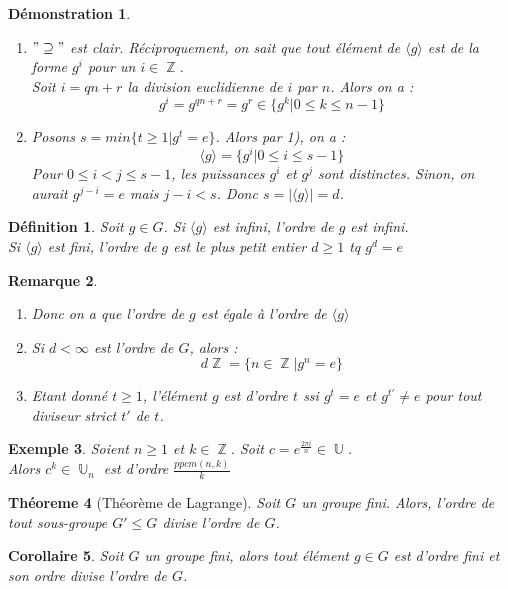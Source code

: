\documentclass[a4paper, oneside]{report}
\theoremstyle{break}
\newtheorem{thm}{Théoreme}[section] %
\newtheorem{defi}[thm]{Définition}
\newtheorem{cor}[thm]{Corollaire}
\newtheorem{exem}[thm]{Exemple}
\newtheorem{remar}[thm]{Remarque}
\newtheorem*{demo}{Démonstration}
\DeclareMathOperator{\Z}{\mathbb{Z}}
\DeclareMathOperator{\U}{\mathbb{U}}
\begin{document}
\begin{demo}
	\begin{enumerate}
		\item $"\supseteq"$ est clair. Réciproquement, on sait que tout élément de $\langle g\rangle$ est de la forme $g^i$ pour un $i \in \Z$.\\
		Soit $i=qn+r$ la division euclidienne de $i$ par $n$. Alors on a :
		$$g^i=g^{qn+r}=g^r \in \{g^k | 0\leq k \leq n-1 \}$$
		
		\item Posons $s=min\{t \geq 1 | g^t=e \}$. Alors par 1), on a :
		$$\langle g\rangle = \{g^i | 0\leq i \leq s-1 \}$$
		Pour $0\leq i < j \leq s-1$, les puissances $g^i$ et $g^j$ sont distinctes. Sinon, on aurait $g^{j-i}=e$ mais $j-i<s$. Donc $s=|\langle g\rangle| = d$.
	\end{enumerate}	
\end{demo}

\begin{defi}
	Soit $g\in G$. Si $\langle g\rangle$ est infini, l'ordre de $g$ est infini.\\
	Si $\langle g\rangle$ est fini, l'ordre de $g$ est le plus petit entier $d\geq 1$ tq $g^d=e$	
\end{defi}

\begin{remar}
	\begin{enumerate}
		\item Donc on a que l'ordre de $g$ est égale à l'ordre de $\langle g\rangle$
		\item Si $d<\infty$ est l'ordre de $G$, alors :
		$$d\Z=\{n\in \Z | g^n =e \}$$
		\item Etant donné $t\geq 1$, l'élément $g$ est d'ordre $t$ ssi $g^t=e$ et $g^{t'}\neq e$ pour tout diviseur strict $t'$ de $t$.
	\end{enumerate}	
\end{remar}

\begin{exem}
	Soient $n\geq 1$ et $k\in \Z$. Soit $c=e^{\frac{2\pi i}{n}}\in \U$.\\
	Alors $c^k\in \U_n$ est d'ordre $\frac{ppcm(n,k)}{k}$	
\end{exem}

\begin{thm}[Théorème de Lagrange]
	Soit $G$ un groupe fini. Alors, l'ordre de tout sous-groupe $G'\leq G$ divise l'ordre de $G$.
\end{thm}

\begin{cor}
	Soit $G$ un groupe fini, alors tout élément $g\in G$ est d'ordre fini et son ordre divise l'ordre de $G$.
\end{cor}
\end{document}
